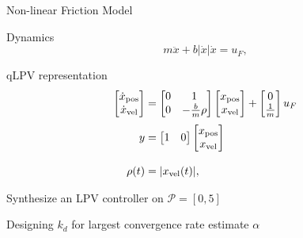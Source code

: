 \documentclass{beamer}
\begin{document}
\begin{frame}{Non-linear Friction Model}
	\begin{block}{Dynamics}
	\begin{equation}\label{eq:NLFsat}
		m\ddot{x}+b\vert\dot{x}\vert\dot{x} = u_F, 
	\end{equation}
	\end{block}
\begin{block}{qLPV representation}
\begin{equation}\label{eq:NLFssLPV}
	\begin{split}
		\begin{bmatrix} \dot{x}_{\textnormal{pos}}\\ \dot{x}_{\textnormal{vel}} \end{bmatrix} 
		&= 
		\begin{bmatrix} 0 & 1 \\ 0 & -\tfrac{b}{m}\rho \end{bmatrix} 
		\begin{bmatrix} x_{\textnormal{pos}}\\ x_{\textnormal{vel}} \end{bmatrix} 
		+
		\begin{bmatrix} 0 \\ \tfrac{1}{m} \end{bmatrix} 
		u_F
		\\[1mm]
		y
		&=
		\begin{bmatrix} 1 & 0 \end{bmatrix}
		\begin{bmatrix} x_{\textnormal{pos}}\\ x_{\textnormal{vel}} \end{bmatrix}
		\\[3mm]
		\rho(t) 
		&=
		\vert x_{\textnormal{vel}}(t)\vert,
	\end{split}
\end{equation}
\begin{block}{Synthesize an LPV controller on $\mathcal{P}=[0,5]$}
\end{block}
\end{block}
\end{frame}
\begin{frame}{Designing $k_d$ for largest convergence rate estimate $\alpha$}
	\begin{figure}[h!]
		\centering
		
		\label{fig:KdvsAlpha_Delta_L70}
	\end{figure}
\end{frame}
\end{document}
